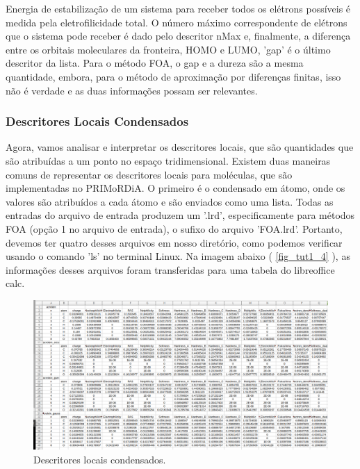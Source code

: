 \documentclass[a4paper,11pt]{refart}
\begin{document}
Energia de estabilização de um sistema para receber todos os elétrons possíveis é medida pela eletrofilicidade total. O número máximo correspondente de elétrons que o sistema pode receber é dado pelo descritor nMax e, finalmente, a diferença entre os orbitais moleculares da fronteira, HOMO e LUMO, 'gap' é o último descritor da lista. Para o método FOA, o gap e a dureza são a mesma quantidade, embora, para o método de aproximação por diferenças finitas, isso não é verdade e as duas informações possam ser relevantes.


\subsubsection{Descritores Locais Condensados}

Agora, vamos analisar e interpretar os descritores locais, que são quantidades que são atribuídas a um ponto no espaço tridimensional. Existem duas maneiras comuns de representar os descritores locais para moléculas, que são implementadas no PRIMoRDiA. O primeiro é o condensado em átomo, onde os valores são atribuídos a cada átomo e são enviados como uma lista. Todas as entradas do arquivo de entrada produzem um '.lrd', especificamente para métodos FOA (opção 1 no arquivo de entrada), o sufixo do arquivo 'FOA.lrd'. Portanto, devemos ter quatro desses arquivos em nosso diretório, como podemos verificar usando o comando 'ls' no terminal Linux. Na imagem abaixo ( \autoref{fig_tut1_4} ), as informações desses arquivos foram transferidas para uma tabela do libreoffice calc.

\hspace*{-\leftmarginwidth}
\begin{minipage}{\fullwidth}
\begin{figure}[H]
\begin{center}
\includegraphics[width=6in]{images/img5}
\caption{Descritores locais condensados.}
\label{fig_tut1_4}
\end{center}
\end{figure}
\end{minipage}
\end{document}
